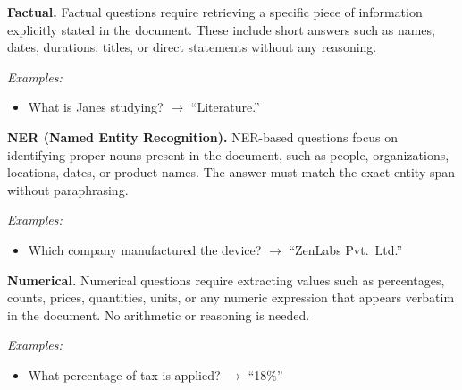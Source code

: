 \begin{tcolorbox}[prompt_extractive, title=Extractive QA Taxonomy]
\medskip

\textbf{Factual.}
Factual questions require retrieving a specific piece of information explicitly stated in the document.
These include short answers such as names, dates, durations, titles, or direct statements without any reasoning.

\medskip
\textit{Examples:}
\begin{itemize}
  \item What is Janes studying? $\rightarrow$ ``Literature.''
\end{itemize}

\medskip

\textbf{NER (Named Entity Recognition).}
NER-based questions focus on identifying proper nouns present in the document, such as people, organizations,
locations, dates, or product names. The answer must match the exact entity span without paraphrasing.

\textit{Examples:}
\begin{itemize}
  \item Which company manufactured the device? $\rightarrow$ ``ZenLabs Pvt.\ Ltd.''
\end{itemize}

\medskip

\textbf{Numerical.}
Numerical questions require extracting values such as percentages, counts, prices, quantities, units, or any
numeric expression that appears verbatim in the document. No arithmetic or reasoning is needed.
\medskip

\textit{Examples:}
\begin{itemize}
  \item What percentage of tax is applied? $\rightarrow$ ``18\%''
\end{itemize}

\end{tcolorbox}

